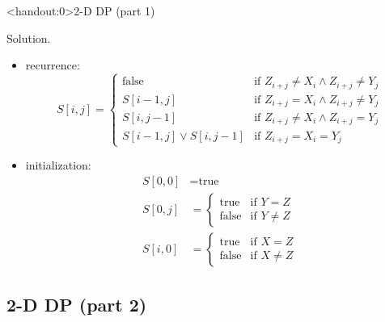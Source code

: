 \begin{frame}<handout:0>{2-D DP (part 1)}
  \begin{block}{Solution.}
    \begin{itemize}
      \item recurrence:
	\begin{displaymath}
	  S[i,j] = \left\{ \begin{array}{ll}
	    \text{false} & \textrm{if $Z_{i+j} \neq X_{i} \land Z_{i+j} \neq Y_{j}$}\\
	    S[i-1,j] & \textrm{if $Z_{i+j} = X_{i} \land Z_{i+j} \neq Y_{j}$}\\
	    S[i,j-1] & \textrm{if $Z_{i+j} \neq X_{i} \land Z_{i+j} = Y_{j}$}\\
	    S[i-1,j] \lor S[i,j-1] & \textrm{if $Z_{i+j} = X_{i} = Y_{j}$}
	  \end{array} \right.
	\end{displaymath}
      \item initialization: 
	\begin{align*}
	  S[0,0] &= \text{true} \\
	  S[0,j] &= \left\{ \begin{array}{ll}
	    \text{true} & \text{if } Y = Z  \\
	    \text{false} & \text{if } Y \neq Z
	  \end{array} \right. \\
	  S[i,0] &= \left\{ \begin{array}{ll}
	    \text{true} & \text{if } X = Z  \\
	    \text{false} & \text{if } X \neq Z
	  \end{array} \right.
	\end{align*}
    \end{itemize}
  \end{block}
\end{frame}
\subsection{2-D DP (part 2)}

